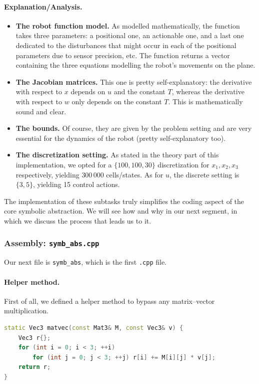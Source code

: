 \documentclass[11pt,a4paper]{article}
\begin{document}
\paragraph{Explanation/Analysis.}
\begin{itemize}
  \item \textbf{The robot function model.} As modelled mathematically, the function takes three
  parameters: a positional one, an actionable one, and a last one dedicated to the disturbances
  that might occur in each of the positional parameters due to sensor precision, etc. The
  function returns a vector containing the three equations modelling the robot's movements on
  the plane.
  \item \textbf{The Jacobian matrices.} This one is pretty self-explanatory: the derivative with
  respect to $x$ depends on $u$ and the constant $T$, whereas the derivative with respect to $w$
  only depends on the constant $T$. This is mathematically sound and clear.
  \item \textbf{The bounds.} Of course, they are given by the problem setting and are very
  essential for the dynamics of the robot (pretty self-explanatory too).
  \item \textbf{The discretization setting.} As stated in the theory part of this
  implementation, we opted for a $\{100,100,30\}$ discretization for $x_1,x_2,x_3$ respectively,
  yielding $300\,000$ cells/states. As for $u$, the discrete setting is $\{3,5\}$, yielding 15
  control actions.
\end{itemize}

The implementation of these subtasks truly simplifies the coding aspect of the core symbolic
abstraction. We will see how and why in our next segment, in which we discuss the process that
leads us to it.

\subsubsection{Assembly: \texttt{symb\_abs.cpp}}
Our next file is \texttt{symb\_abs}, which is the first \texttt{.cpp} file.

\paragraph{Helper method.}
First of all, we defined a helper method to bypass any matrix--vector multiplication.

\begin{lstlisting}[language=C++,caption={Matrix--vector multiplication helper.}]
static Vec3 matvec(const Mat3& M, const Vec3& v) {
    Vec3 r{};
    for (int i = 0; i < 3; ++i)
        for (int j = 0; j < 3; ++j) r[i] += M[i][j] * v[j];
    return r;
}
\end{lstlisting}
\end{document}
